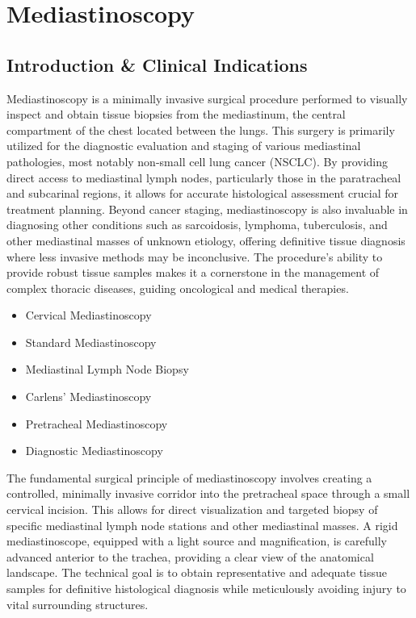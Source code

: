 \chapter{Mediastinoscopy}

\section*{Introduction \& Clinical Indications}
Mediastinoscopy is a minimally invasive surgical procedure performed to visually inspect and obtain tissue biopsies from the mediastinum, the central compartment of the chest located between the lungs. This surgery is primarily utilized for the diagnostic evaluation and staging of various mediastinal pathologies, most notably non-small cell lung cancer (NSCLC). By providing direct access to mediastinal lymph nodes, particularly those in the paratracheal and subcarinal regions, it allows for accurate histological assessment crucial for treatment planning. Beyond cancer staging, mediastinoscopy is also invaluable in diagnosing other conditions such as sarcoidosis, lymphoma, tuberculosis, and other mediastinal masses of unknown etiology, offering definitive tissue diagnosis where less invasive methods may be inconclusive. The procedure's ability to provide robust tissue samples makes it a cornerstone in the management of complex thoracic diseases, guiding oncological and medical therapies.

\begin{itemize}
  \item Cervical Mediastinoscopy
  \item Standard Mediastinoscopy
  \item Mediastinal Lymph Node Biopsy
  \item Carlens' Mediastinoscopy
  \item Pretracheal Mediastinoscopy
  \item Diagnostic Mediastinoscopy
\end{itemize}

The fundamental surgical principle of mediastinoscopy involves creating a controlled, minimally invasive corridor into the pretracheal space through a small cervical incision. This allows for direct visualization and targeted biopsy of specific mediastinal lymph node stations and other mediastinal masses. A rigid mediastinoscope, equipped with a light source and magnification, is carefully advanced anterior to the trachea, providing a clear view of the anatomical landscape. The technical goal is to obtain representative and adequate tissue samples for definitive histological diagnosis while meticulously avoiding injury to vital surrounding structures.

